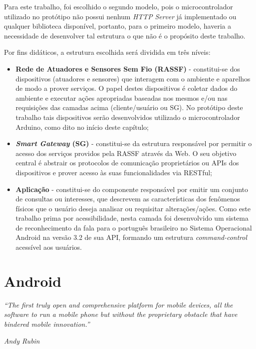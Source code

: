 \documentclass[12pt,a4paper,oneside]{report}
\begin{document}
Para este trabalho, foi escolhido o segundo modelo, pois o microcontrolador utilizado no protótipo não possui nenhum \emph{HTTP Server} já implementado ou qualquer biblioteca disponível, portanto, para o primeiro modelo, haveria a necessidade de desenvolver tal estrutura o que não é o propósito deste trabalho.

Por fins didáticos, a estrutura escolhida será dividida em três níveis:
\begin{itemize}
    \item \textbf{Rede de Atuadores e Sensores Sem Fio (RASSF)} - constitui-se dos dispositivos (atuadores e sensores) que interagem com o ambiente e aparelhos de modo a prover serviços. O papel destes dispositivos é coletar dados do ambiente e executar ações apropriadas baseadas nos mesmos e/ou nas requisições das camadas acima (cliente/usuário ou SG). No protótipo deste trabalho tais dispositivos serão desenvolvidos utilizado o microcontrolador Arduino, como dito no início deste capítulo;
    \item \textbf{\emph{Smart Gateway} (SG)} - constitui-se da estrutura responsável por permitir o acesso dos serviços providos pela RASSF através da Web. O seu objetivo central é abstrair os protocolos de comunicação proprietários ou APIs dos dispositivos e prover acesso às suas funcionalidades via RESTful;
    \item \textbf{Aplicação} - constitui-se do componente responsável por emitir um conjunto de consultas ou interesses, que descrevem as características dos fenômenos físicos que o usuário deseja analisar ou requisitar alterações/ações. Como este trabalho prima por acessibilidade, nesta camada foi desenvolvido um sistema de reconhecimento da fala para o português brasileiro no Sistema Operacional Android na versão 3.2 de sua API, formando um estrutura \emph{command-control} acessível aos usuários.
\end{itemize}

%
%
\section{Android}

\begin{center}
\begin{minipage}{.8\textwidth}
\emph{``The first truly open and comprehensive platform for mobile devices, all the software to run a mobile phone but without the proprietary obstacle that have bindered mobile innovation.''}
\begin{flushright}
    \begin{minipage}{.3\textwidth}
	\emph{Andy Rubin}\cite{Andy Rubin}
    \end{minipage}
\end{flushright}

\end{minipage}
\end{center}
\end{document}
